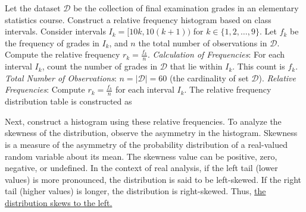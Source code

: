 \documentclass[12pt]{article}
\begin{document}
Let the dataset \( \mathcal{D} \) be the collection of final examination grades in an elementary statistics course. Construct a relative frequency histogram based on class intervals. Consider intervals \(I_k = [10k, 10(k+1))\) for \(k \in \{1, 2, \ldots, 9\}\). Let \(f_k\) be the frequency of grades in \(I_k\), and \(n\) the total number of observations in \( \mathcal{D} \). Compute the relative frequency \( r_k = \frac{f_k}{n} \). \textit{Calculation of Frequencies}: For each interval \(I_k\), count the number of grades in \( \mathcal{D} \) that lie within \(I_k\). This count is \(f_k\). \textit{Total Number of Observations}: \( n = |\mathcal{D}| = 60 \) (the cardinality of set \( \mathcal{D} \)). \textit{Relative Frequencies}: Compute \( r_k = \frac{f_k}{n} \) for each interval \(I_k\). The relative frequency distribution table is constructed as
\begin{center}
\end{center}
Next, construct a histogram using these relative frequencies. To analyze the skewness of the distribution, observe the asymmetry in the histogram. Skewness is a measure of the asymmetry of the probability distribution of a real-valued random variable about its mean. The skewness value can be positive, zero, negative, or undefined. In the context of real analysis, if the left tail (lower values) is more pronounced, the distribution is said to be left-skewed. If the right tail (higher values) is longer, the distribution is right-skewed. Thus,  \underline{the distribution skews to the left.}


\begin{figure}
    \centering
    \resizebox{0.7\textwidth}{!}{}
    \caption{}
\end{figure}
\end{document}
